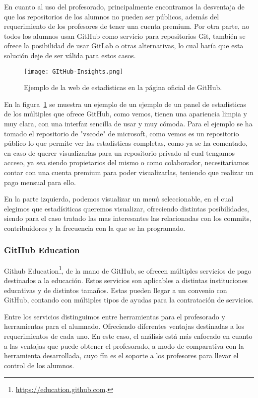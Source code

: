 En cuanto al uso del profesorado, principalmente encontramos la desventaja
de que los repositorios de los alumnos no pueden ser públicos, además del
requerimiento de los profesores de tener una cuenta premium. Por otra
parte, no todos los alumnos usan GitHub como servicio para repositorios
Git, también se ofrece la posibilidad de usar GitLab o otras alternativas,
lo cual haría que esta solución deje de ser válida para estos casos.


\begin{figure}[h!]
  \texttt{[image: GItHub-Insights.png]}
  \caption{Ejemplo de la web de estadísticas en la página oficial de
    GitHub.}
  \label{figure:GithubInsights}
\end{figure}

En la figura~\ref{figure:GithubInsights} se muestra un ejemplo de un
ejemplo de un panel de estadísticas de los múltiples que ofrece GitHub,
como vemos, tienen una apariencia limpia y muy clara, con una interfaz
sencilla de usar y muy cómoda. Para el ejemplo se ha tomado el repositorio
de "vscode" de microsoft, como vemos es un repositorio público lo que
permite ver las estadísticas completas, como ya se ha comentado, en caso de
querer visualizarlas para un repositorio privado al cual tengamos acceso,
ya sea siendo propietarios del mismo o como colaborador, necesitaríamos
contar con una cuenta premium para poder visualizarlas, teniendo que
realizar un pago mensual para ello.

En la parte izquierda, podemos visualizar un menú seleccionable, en el cual
elegimos que estadísiticas queremos visualizar, ofreciendo distintas
posibilidades, siendo para el caso tratado las mas interesantes las
relacionadas con los commits, contribuidores y la frecuencia con la que se
ha programado.

\subsubsection{GitHub Education}

Github Education\footnote{\url{https://education.github.com}.}, de la mano
de GitHub, se ofrecen múltiples servicios de pago destinados a la
educación. Estos servicios son aplicables a distintas instituciones
educativas y de distintos tamaños. Estas pueden llegar a un convenio con
GitHub, contando con múltiples tipos de ayudas para la contratación de
servicios.

Entre los servicios distinguimos entre herramientas para el profesorado y
herramientas para el alumnado. Ofreciendo diferentes ventajas destinadas a
los requerimientos de cada uno. En este caso, el análisis está más enfocado
en cuanto a las ventajas que puede obtener el profesorado, a modo de
comparativa con la herramienta desarrollada, cuyo fín es el soporte a los
profesores para llevar el control de los alumnos.

